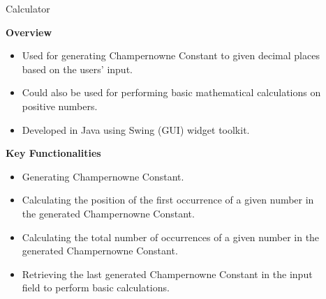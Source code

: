 \documentclass[final]{beamer}
\newlength{\sepwid}
\newlength{\onecolwid}
\newlength{\twocolwid}
\begin{document}
\begin{frame}[t]
\begin{columns}[t]
\begin{column}{\onecolwid}

\end{column} %

\begin{column}{\sepwid}\end{column} %

\begin{column}{\twocolwid} %

\begin{columns}[t,totalwidth=\twocolwid] %

\begin{column}{\onecolwid}\vspace{-.6in} %


\begin{block}{Calculator}

\textbf{Overview}

\begin{itemize}
\item Used for generating Champernowne Constant to given decimal places based on the users' input.
\item Could also be used for performing basic mathematical calculations on positive numbers.
\item Developed in Java using Swing (GUI) widget toolkit.
\end{itemize}

\vskip3cm

\textbf{Key Functionalities}

\begin{itemize}
\item Generating Champernowne Constant.
\item Calculating the position of the first occurrence of a given number in the generated Champernowne Constant.
\item Calculating the total number of occurrences of a given number in the generated Champernowne Constant.
\item Retrieving the last generated Champernowne Constant in the input field to perform basic calculations.
\end{itemize}


\end{block}
\end{column}
\end{columns}
\end{column}
\end{columns}
\end{frame}
\end{document}
